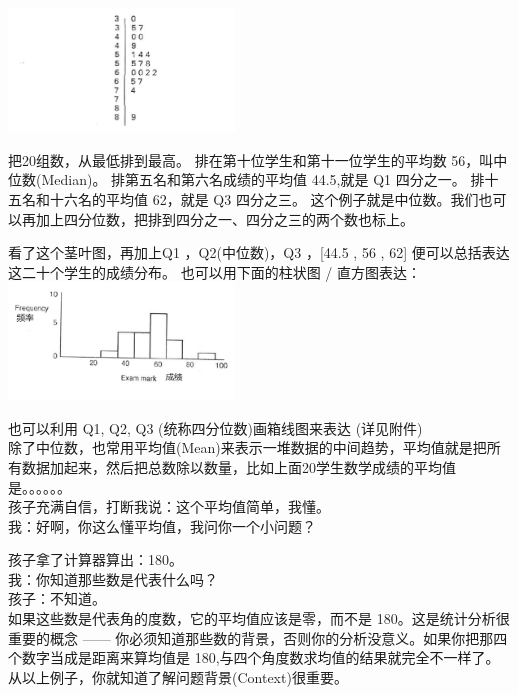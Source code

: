 \includegraphics[width=6cm]{MA_FA2_10.png}

把20组数，从最低排到最高。 排在第十位学生和第十一位学生的平均数
56，叫中位数(Median)。 排第五名和第六名成绩的平均值 44.5,就是 Q1
四分之一。 排十五名和十六名的平均值 62，就是 Q3 四分之三。
这个例子就是中位数。我们也可以再加上四分位数，把排到四分之一、四分之三的两个数也标上。

看了这个茎叶图，再加上Q1 ，Q2(中位数)，Q3 ，{[}44.5 , 56 , 62{]}
便可以总括表达这二十个学生的成绩分布。 也可以用下面的柱状图 /
直方图表达：\\

\includegraphics[width=6cm]{MA_FA1_10.png}

 	
也可以利用 Q1, Q2, Q3 (统称四分位数)画箱线图来表达 (详见附件)\\

除了中位数，也常用平均值(Mean)来表示一堆数据的中间趋势，平均值就是把所有数据加起来，然后把总数除以数量，比如上面20学生数学成绩的平均值是。。。。。。\\
孩子充满自信，打断我说：这个平均值简单，我懂。\\
我：好啊，你这么懂平均值，我问你一个小问题？\\


孩子拿了计算器算出：180。\\
我：你知道那些数是代表什么吗？\\
孩子：不知道。\\
如果这些数是代表角的度数，它的平均值应该是零，而不是
180。这是统计分析很重要的概念 ------
你必须知道那些数的背景，否则你的分析没意义。如果你把那四个数字当成是距离来算均值是
180,与四个角度数求均值的结果就完全不一样了。\\
从以上例子，你就知道了解问题背景(Context)很重要。

